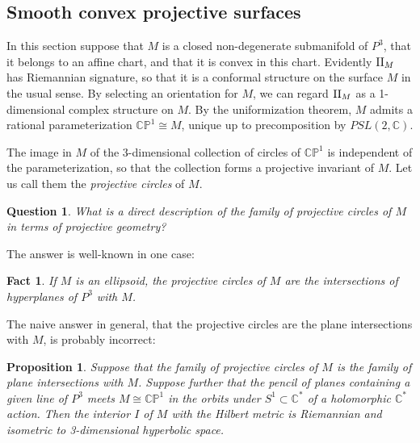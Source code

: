 \documentclass[11pt]{article}
\numberwithin{equation}{section}
\newcounter{count}
\theoremstyle{plain}
\newtheorem{proposition}[count]{Proposition}
\newtheorem{question}[count]{Question}
\newtheorem{fact}[count]{Fact}
\theoremstyle{remark}
\newcommand{\II}{\textnormal{II}}
\begin{document}

\subsection{Smooth convex projective surfaces}

In this section suppose that $M$ is a closed non-degenerate submanifold of $P^{3}$, that it belongs to an affine chart, and that it is convex in this chart. Evidently $\II_M$ has Riemannian signature, so that it is a conformal structure on the surface $M$ in the usual sense. By selecting an orientation for $M$, we can regard $\II_M$ as a 1-dimensional complex structure on $M$. By the uniformization theorem, $M$ admits a rational parameterization $\mathbb{CP}^{1}\cong M$, unique up to precomposition by $PSL(2,\mathbb{C})$.

The image in $M$ of the 3-dimensional collection of circles of $\mathbb{CP}^{1}$ is independent of the parameterization, so that the collection forms a projective invariant of $M$. Let us call them the \emph{projective circles} of $M$.

\begin{question}\label{qcf} What is a direct description of the family of projective circles of $M$ in terms of projective geometry?
\end{question}

The answer is well-known in one case:

\begin{fact} If $M$ is an ellipsoid, the projective circles of $M$ are the intersections of hyperplanes of $P^{3}$ with $M$.
\end{fact}

The naive answer in general, that the projective circles are the plane intersections with $M$, is probably incorrect:

\begin{proposition}Suppose that the family of projective circles of $M$ is the family of plane intersections with $M$. Suppose further that the pencil of planes containing a given line of $P^{3}$ meets $M\cong \mathbb{CP}^{1}$ in the orbits under $S^{1}\subset \mathbb{C}^{*}$ of a holomorphic $\mathbb{C}^{*}$ action. Then the interior $I$ of $M$ with the Hilbert metric is Riemannian and isometric to 3-dimensional hyperbolic space.
\end{proposition}
\end{document}
